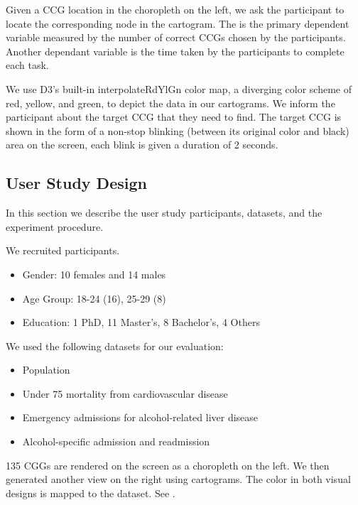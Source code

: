  Given a CCG location in the choropleth on the left, we ask the participant to locate the corresponding node in the cartogram. The is the primary dependent variable measured by the number of correct CCGs chosen by the participants.  Another dependant variable is the time taken by the participants to complete each task.

 We use D3's built-in interpolateRdYlGn color map, a diverging color scheme of red, yellow, and green, to depict the data in our cartograms.  We inform the participant about the target CCG that they need to find. The target CCG is shown in the form of a non-stop blinking (between its original color and black) area on the screen, each blink is given a duration of 2 seconds.

\subsection{User Study Design}
In this section we describe the user study participants, datasets, and the experiment procedure.

 We recruited \pCount participants.

\begin{itemize}
    \item Gender:  10 females and 14 males
    \item Age Group:   18-24 (16), 25-29 (8)
    \item Education:   1 PhD, 11 Master's, 8 Bachelor's, 4 Others
\end{itemize}

 We used the following datasets for our evaluation:

\begin{itemize}
    \item Population
    \item Under 75 mortality from cardiovascular disease
    \item Emergency admissions for alcohol-related liver disease
    \item Alcohol-specific admission and readmission
\end{itemize}

135 CGGs are rendered on the screen as a choropleth on the left. We then generated another view on the right using cartograms. The color in both visual designs is mapped to the dataset. See .

